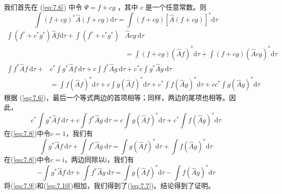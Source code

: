     我们首先在 (\ref{eq:7.6}) 中令 $ \Psi = f+cg$ ，其中 $c$ 是一个任意常数。则
    \begin{equation*}
        \int \left(f+cg\right)^{\ast}\hat{A}\left(f+cg\right)\mathrm{d}\tau = \int \left(f+cg\right)\left[\hat{A}\left(f+cg\right)\right]^{\ast}\mathrm{d}\tau
    \end{equation*}
    \begin{equation*}
        \begin{aligned}
            \int \left(f^{\ast}+c^{\ast}g^{\ast}\right)\hat{A}f\mathrm{d}\tau + \int \left(f^{\ast} +c^{\ast}g^{\ast} \right)&\hat{A}cg \:\mathrm{d}\tau \\
            & = \int \left(f+c g\right)\left(\hat{A}f\right)^{\ast} \mathrm{d}\tau + \int \left(f+c g\right)\left(\hat{A}cg\right)^{\ast} \mathrm{d}\tau
        \end{aligned}
    \end{equation*}
    \begin{equation*}
        \begin{aligned}
            \int f^{\ast} \hat{A} f \:\mathrm{d}\tau + & c^{\ast} \int g^{\ast} \hat{A} f \:\mathrm{d}\tau + c \int f^{\ast} \hat{A} g \:\mathrm{d}\tau + c^{\ast}c \int g^{\ast} \hat{A} g \:\mathrm{d}\tau  \\
            & =\int f \left(\hat{A}f\right)^{\ast} \mathrm{d}\tau + c \int g \left(\hat{A}f\right)^{\ast} \mathrm{d}\tau + c^{\ast} \int f \left(\hat{A}g\right)^{\ast} \mathrm{d}\tau + cc^{\ast}\int g \left(\hat{A}g\right)^{\ast} \mathrm{d}\tau
        \end{aligned}
    \end{equation*}
    根据 (\ref{eq:7.6})，最后一个等式两边的首项相等；同样，两边的尾项也相等。因此，
    \begin{equation}
        c^{\ast} \int g^{\ast} \hat{A} f \:\mathrm{d}\tau + c \int f^{\ast} \hat{A} g \:\mathrm{d}\tau = c \int g \left(\hat{A}f\right)^{\ast} \mathrm{d}\tau + c^{\ast} \int f \left(\hat{A}g\right)^{\ast} \mathrm{d}\tau
        \label{eq:7.8}
    \end{equation}
    在(\ref{eq:7.8})中令$c=1$，我们有
    \begin{equation}
        \int g^{\ast} \hat{A} f \:\mathrm{d}\tau + \int f^{\ast} \hat{A} g \:\mathrm{d}\tau = \int g \left(\hat{A}f\right)^{\ast} \mathrm{d}\tau + \int f \left(\hat{A}g\right)^{\ast} \mathrm{d}\tau
        \label{eq:7.9}
    \end{equation}
    在(\ref{eq:7.8})中令$c = \mathrm{i}$，两边同除以$\mathrm{i}$，我们有
    \begin{equation}
        - \int g^{\ast} \hat{A} f \:\mathrm{d}\tau + \int f^{\ast} \hat{A} g \:\mathrm{d}\tau = \int g \left(\hat{A}f\right)^{\ast} \mathrm{d}\tau - \int f \left(\hat{A}g\right)^{\ast} \mathrm{d}\tau
        \label{eq:7.10}
    \end{equation}
    将(\ref{eq:7.9})和(\ref{eq:7.10})相加，我们得到了(\ref{eq:7.7})。结论得到了证明。

